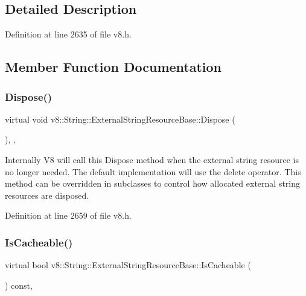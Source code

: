 \subsection{Detailed Description}


Definition at line 2635 of file v8.\+h.



\subsection{Member Function Documentation}
\mbox{\label{classv8_1_1String_1_1ExternalStringResourceBase_af4720342ae31e1ab4656df3f15d069c0}} 
\subsubsection{\texorpdfstring{Dispose()}{Dispose()}}
{\footnotesize\ttfamily virtual void v8\+::\+String\+::\+External\+String\+Resource\+Base\+::\+Dispose (\begin{DoxyParamCaption}{ }\end{DoxyParamCaption})\hspace{0.3cm}{\ttfamily [inline]}, {\ttfamily [protected]}, {\ttfamily [virtual]}}

Internally V8 will call this Dispose method when the external string resource is no longer needed. The default implementation will use the delete operator. This method can be overridden in subclasses to control how allocated external string resources are disposed. 

Definition at line 2659 of file v8.\+h.

\mbox{\label{classv8_1_1String_1_1ExternalStringResourceBase_a994c7580185c831abd45075d297dd07c}} 
\subsubsection{\texorpdfstring{Is\+Cacheable()}{IsCacheable()}}
{\footnotesize\ttfamily virtual bool v8\+::\+String\+::\+External\+String\+Resource\+Base\+::\+Is\+Cacheable (\begin{DoxyParamCaption}{ }\end{DoxyParamCaption}) const\hspace{0.3cm}{\ttfamily [inline]}, {\ttfamily [virtual]}}

